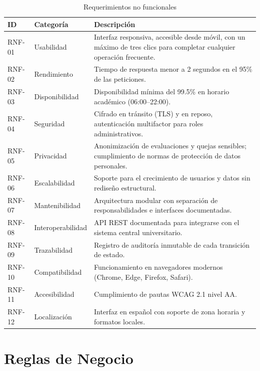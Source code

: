 \begin{table}[H]
\centering
\caption{Requerimientos no funcionales}
\label{tab:rnf}
\small
\begin{tabularx}{\textwidth}{@{}p{1.5cm} l X@{}}
\toprule
\rowcolor{verdeClaro}
\textbf{ID} & \textbf{Categoría} & \textbf{Descripción} \\
\midrule
RNF-01 & Usabilidad &
    Interfaz responsiva, accesible desde móvil, con un máximo de tres clics
    para completar cualquier operación frecuente. \\
RNF-02 & Rendimiento &
    Tiempo de respuesta menor a 2 segundos en el 95\% de las peticiones. \\
RNF-03 & Disponibilidad &
    Disponibilidad mínima del 99.5\% en horario académico (06:00--22:00). \\
RNF-04 & Seguridad &
    Cifrado en tránsito (TLS) y en reposo, autenticación multifactor para roles
    administrativos. \\
RNF-05 & Privacidad &
    Anonimización de evaluaciones y quejas sensibles; cumplimiento de normas de
    protección de datos personales. \\
RNF-06 & Escalabilidad &
    Soporte para el crecimiento de usuarios y datos sin rediseño estructural. \\
RNF-07 & Mantenibilidad &
    Arquitectura modular con separación de responsabilidades e interfaces
    documentadas. \\
RNF-08 & Interoperabilidad &
    \ac{API} \ac{REST} documentada para integrarse con el sistema central
    universitario. \\
RNF-09 & Trazabilidad &
    Registro de auditoría inmutable de cada transición de estado. \\
RNF-10 & Compatibilidad &
    Funcionamiento en navegadores modernos (Chrome, Edge, Firefox, Safari). \\
RNF-11 & Accesibilidad &
    Cumplimiento de pautas WCAG 2.1 nivel AA. \\
RNF-12 & Localización &
    Interfaz en español con soporte de zona horaria y formatos locales. \\
\bottomrule
\end{tabularx}
\end{table}

\section{Reglas de Negocio}

